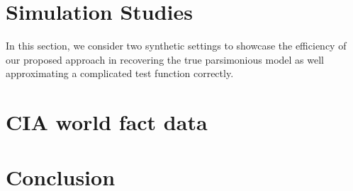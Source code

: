 \documentclass{amsart}
\begin{document}
\section{Simulation Studies}\label{sec:sim}

In this section, we consider two synthetic settings to showcase the efficiency of our proposed approach in recovering the true parsimonious model as well approximating a complicated test function correctly. 


\section{CIA world fact data}\label{sec:cia}

\section{Conclusion}\label{sec:conc}




\end{document}
